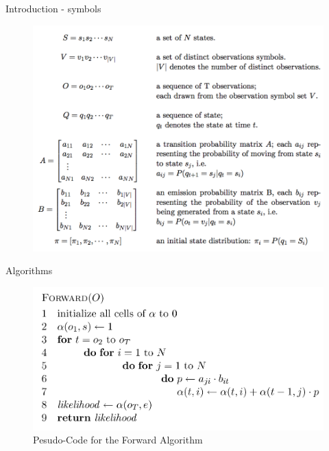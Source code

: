 \documentclass[11pt]{beamer}
\begin{document}
\begin{frame}{Introduction - symbols}
\begin{figure}
\includegraphics[scale=0.25]{"symbols"}
\end{figure}
\end{frame}

\begin{frame}{Algorithms}
\begin{figure}[H]

\centering
\includegraphics[scale=0.4]{"FW"}
\caption{Pesudo-Code for the Forward Algorithm \cite{cuhmm}}
\end{figure}

\end{frame}
\end{document}
